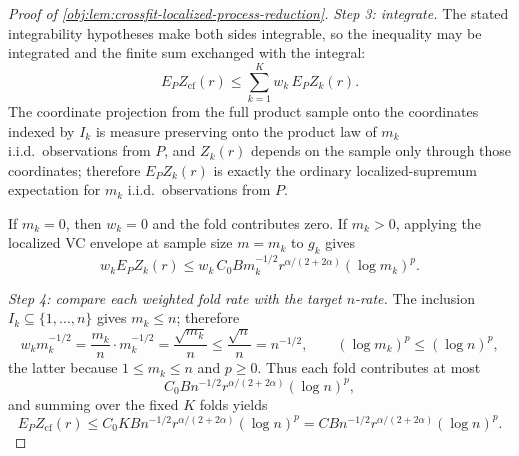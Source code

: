 \begin{proof}[Proof of \cref{obj:lem:crossfit-localized-process-reduction}]
\emph{Step 3: integrate.}  The stated integrability hypotheses make both sides integrable, so the inequality may be integrated and the finite sum exchanged with the integral:
\[
E_P Z_{\mathrm{cf}}(r)\le\sum_{k=1}^K w_k\,E_P Z_k(r).
\]
The coordinate projection from the full product sample onto the coordinates indexed by \(I_k\) is measure preserving onto the product law of \(m_k\) i.i.d.\ observations from \(P\), and \(Z_k(r)\) depends on the sample only through those coordinates; therefore \(E_PZ_k(r)\) is exactly the ordinary localized-supremum expectation for \(m_k\) i.i.d.\ observations from \(P\). %

If \(m_k=0\), then \(w_k=0\) and the fold contributes zero.  If \(m_k>0\), applying the localized VC envelope at sample size \(m=m_k\) to \(g_k\) gives
\[
w_k E_PZ_k(r)
\le
w_k\,C_0 B m_k^{-1/2}r^{\alpha/(2+2\alpha)}(\log m_k)^p .
\]

\emph{Step 4: compare each weighted fold rate with the target \(n\)-rate.}  The inclusion \(I_k\subseteq\{1,\ldots,n\}\) gives \(m_k\le n\); therefore
\[
w_k m_k^{-1/2}
=
\frac{m_k}{n}\cdot m_k^{-1/2}
=
\frac{\sqrt{m_k}}{n}
\le
\frac{\sqrt n}{n}
=
n^{-1/2},
\qquad
(\log m_k)^p\le(\log n)^p,
\]
the latter because \(1\le m_k\le n\) and \(p\ge0\). %
Thus each fold contributes at most
\[
C_0 B n^{-1/2}r^{\alpha/(2+2\alpha)}(\log n)^p,
\]
and summing over the fixed \(K\) folds yields
\[
E_P Z_{\mathrm{cf}}(r)
\le
C_0K B n^{-1/2}r^{\alpha/(2+2\alpha)}(\log n)^p
=
C B n^{-1/2}r^{\alpha/(2+2\alpha)}(\log n)^p .
\]
\end{proof}
